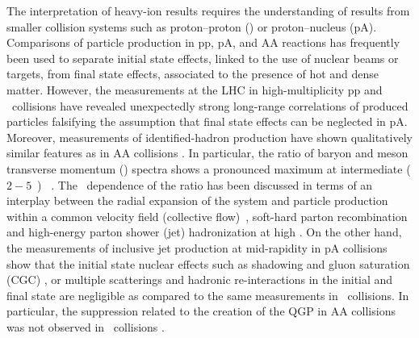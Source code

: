 The interpretation of heavy-ion results requires the understanding of results from smaller collision systems such as proton--proton (\pp) or proton--nucleus (pA).
Comparisons of particle production in pp, pA, and AA reactions has frequently been used to separate initial state effects, linked to the use of nuclear beams or targets, from final state effects, associated to the presence of hot and
dense matter.
However, the measurements at the LHC in high-multiplicity pp and \pPb\ collisions have revealed unexpectedly strong long-range correlations of produced particles \cite{Khachatryan:2010gv,CMS:2012qk,Abelev:2012ola,Aad:2012gla,Aad:2013fja,Chatrchyan:2013nka} falsifying the assumption that final state effects can be neglected in pA.
Moreover, measurements of identified-hadron production \cite{Abelev:2013haa} have shown qualitatively similar features as in AA collisions \cite{Abelev:2013xaa,ABELEV:2013wsa}.
In particular, the ratio of baryon and meson transverse momentum (\pt) spectra shows a pronounced maximum at intermediate ($2-5$~\gevc) \pt~\cite{Abelev:2013haa}.
The \pt\ dependence of the ratio has been discussed in terms of an interplay between the radial expansion of the system and particle production within a common velocity field (collective flow)~\cite{Schnedermann:1993ws}, soft-hard parton recombination \cite{Fries:2003vb} and high-energy parton shower (jet) hadronization at high \pT.
On the other hand, the measurements of inclusive jet production at mid-rapidity in pA collisions \cite{Adam:2015hoa,Adam:2015xea} show that the initial state nuclear effects such as shadowing and gluon saturation (CGC) \cite{McLerran:2001sr,Salgado:2011wc}, or multiple scatterings and hadronic re-interactions in the initial and final state \cite{Krzywicki:1979gv,Accardi:2007in} are negligible as compared to the same measurements in \pp\ collisions.
In particular, the suppression related to the creation of the QGP in AA collisions was not observed in \pPb\ collisions \cite{Aad:2010bu,Chatrchyan:2012nia,Aad:2012vca,Abelev:2013kqa,Aad:2014bxa}.

